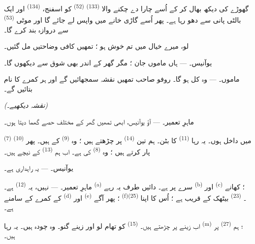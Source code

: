 گھوڑے کی دیکھ بھال کر کے اُسے چارا دے چکنے والا 
\textsuperscript{(133)}  \textsuperscript{(52)} کو
اسفنج،  \textsuperscript{(134)} اور ایک بالٹی
پانی سے دھو رہا ہے۔ پھر اُسے گاڑی خانے میں واپس لے جائے گا اور موٹی
 \textsuperscript{(53)} سے دروازہ بند کرے گا۔

لو، میرے خیال میں تم خوش ہو ؛ تمھیں کافی وضاحتیں مل گئیں۔

\textsc{یوآنیس}۔ --- ہاں ماموں جان ؛ مگر گھر کے اندر بھی شوق سے
دیکھوں گا۔

\textsc{ماموں}۔ --- وہ کل ہو گا۔ روفو صاحب تمھیں نقشہ سمجھائیں گے اور
ہر کمرے کا نام بتائیں گے۔

\VUsaut{3.0mm}
\VUsaut{2.4mm}

{\centering\textit{(نقشہ دیکھیے۔)}\par}
\VUsaut{2.4mm}

\textsc{ماہرِ تعمیر}۔ --- آؤ یوآنیس، ابھی تمھیں گھر کے مختلف حصے
گھما دیتا ہوں۔

 \textsuperscript{(7)} میں داخل ہوں۔ یہ رہا
 \textsuperscript{(11)} کا بٹن۔ ہم تین 
\textsuperscript{(14)} پر چڑھتے ہیں ؛ وہ 
\textsuperscript{(9)} کے ہیں۔ پھر  \textsuperscript{(10)}
پار کرتے ہیں ؛ وہ  \textsuperscript{(8)} کی ہے۔
اب ہم  \textsuperscript{(13)} کے نیچے ہیں۔

\textsc{یوآنیس}۔ --- یہ راہداری ہے۔

\textsc{ماہرِ تعمیر}۔ --- نہیں، یہ 
\textsuperscript{(12)} ہے۔  \textsuperscript{(a)} سرے
پر ہے۔ دائیں طرف یہ رہے  \textsuperscript{(b)} اور
 \textsuperscript{(c)} ؛ کھانے کے کمرے کے سامنے
 \textsuperscript{(d)} اور 
\textsuperscript{(e)} ؛ پھر آگے 
\textsuperscript{(f)}۔  \textsuperscript{(23)} بیٹھک کے
قریب ہے ؛ اُس کا اپنا  \textsuperscript{(25)}
ہے۔

اب زینے پر چڑھتے ہیں۔  \textsuperscript{(15)} کو تھام
لو اور زینے گنو۔ وہ چودہ ہیں۔ یہ رہا 
\textsuperscript{(m)} ؛ ہم  \textsuperscript{(27)} پر
ہیں۔

\VUsaut{3.0mm}
\VUsaut{3.0mm}

